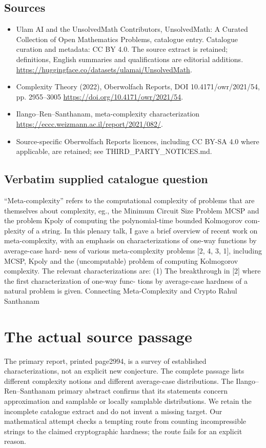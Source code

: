 \documentclass[11pt]{article}
\begin{document}
\subsection{Sources}
\begin{itemize}
\item[S1] Ulam AI and the UnsolvedMath Contributors, UnsolvedMath: A Curated Collection of Open Mathematics Problems, catalogue entry. Catalogue curation and metadata: CC BY 4.0. The source extract is retained; definitions, English summaries and qualifications are editorial additions.
\url{https://huggingface.co/datasets/ulamai/UnsolvedMath}.
\item[S2] Complexity Theory (2022), Oberwolfach Reports, DOI 10.4171/owr/2021/54, pp. 2955--3005
\url{https://doi.org/10.4171/owr/2021/54}.
\item[S3] Ilango--Ren--Santhanam, meta-complexity characterization
\url{https://eccc.weizmann.ac.il/report/2021/082/}.
\item Source-specific Oberwolfach Reports licences, including CC BY-SA 4.0 where applicable, are retained; see THIRD\_PARTY\_NOTICES.md.
\end{itemize}
\subsection{Verbatim supplied catalogue question}
“Meta-complexity” refers to the computational complexity of problems that are themselves about complexity, eg., the Minimum Circuit Size Problem MCSP and the problem Kpoly of computing the polynomial-time bounded Kolmogorov com- plexity of a string. In this plenary talk, I gave a brief overview of recent work on meta-complexity, with an emphasis on characterizations of one-way functions by average-case hard- ness of various meta-complexity problems [2, 4, 3, 1], including MCSP, Kpoly and the (uncomputable) problem of computing Kolmogorov complexity. The relevant characterizations are: (1) The breakthrough in [2] where the first characterization of one-way func- tions by average-case hardness of a natural problem is given. Connecting Meta-Complexity and Crypto Rahul Santhanam

\section{The actual source passage}
The primary report, printed page2994, is a survey of established
characterizations, not an explicit new conjecture. The complete
passage lists different complexity notions and different
average-case distributions. The Ilango--Ren--Santhanam primary
abstract confirms that its statements concern approximation and
samplable or locally samplable distributions. We retain the
incomplete catalogue extract and do not invent a missing target.
Our mathematical attempt checks a tempting route from counting
incompressible strings to the claimed cryptographic hardness;
the route fails for an explicit reason.
\end{document}
